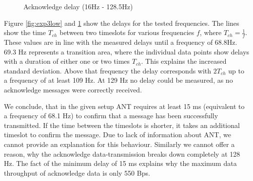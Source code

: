 \begin{description}
\begin{figure}[H]
		\caption{Acknowledge delay (16Hz - 128.5Hz)}\label{fig:exp3high}
	\end{figure}
	Figure \ref{fig:exp3low} and \ref{fig:exp3high} show the delays for the tested frequencies. The lines show the time $T_{ch}$ between two timeslots for various frequencies $f$, where $T_{ch} = \frac{1}{f}$. These values are in line with the measured delays until a frequency of 68.8Hz. 69.3 Hz represents a transition area, where the individual data points show delays with a duration of either one or two times $T_{ch}$. This explains the increased standard deviation. Above that frequency the delay corresponds with $2T_{ch}$ up to a frequency of at least 109 Hz. At 129 Hz no delay could be measured, as no acknowledge messages were correctly received. 

	We conclude, that in the given setup ANT requires at least 15 ms (equivalent to a frequency of 68.1 Hz) to confirm that a message has been successfully transmitted. If the time between the timeslots is shorter, it takes an additional timeslot to confirm the message. Due to lack of information about ANT, we cannot provide an explanation for this behaviour. Similarly we cannot offer a reason, why the acknowledge data-transmission breaks down completely at 128 Hz. The fact of the minimum delay of 15 ms explains why the maximum data throughput of acknowledge data is only 550 Bps.

\end{description}
\newpage


